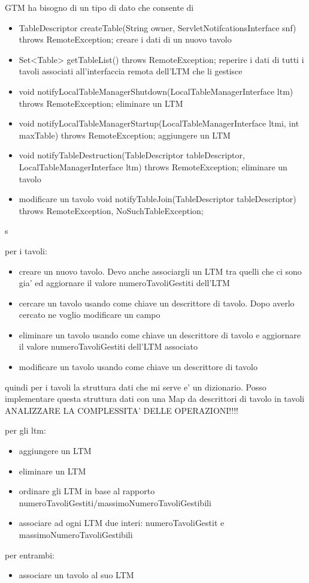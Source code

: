 




GTM ha bisogno di un tipo di dato che consente di
    \begin{itemize}    
      \item 
	TableDescriptor createTable(String owner, ServletNotifcationsInterface snf) throws RemoteException;
	creare i dati di un nuovo tavolo
      \item
	Set<Table> getTableList() throws RemoteException;
	reperire i dati di tutti i tavoli associati all'interfaccia remota dell'LTM che li gestisce
      \item
	void notifyLocalTableManagerShutdown(LocalTableManagerInterface ltm) throws RemoteException;
	eliminare un LTM
      \item
	void notifyLocalTableManagerStartup(LocalTableManagerInterface ltmi, int maxTable) throws RemoteException;
	aggiungere un LTM
      \item
	void notifyTableDestruction(TableDescriptor tableDescriptor, LocalTableManagerInterface ltm) throws RemoteException;
	eliminare un tavolo
      \item
	modificare un tavolo
	void notifyTableJoin(TableDescriptor tableDescriptor) throws RemoteException, NoSuchTableException;
    \end{itemize} 
s

per i tavoli:
\begin{itemize}
    \item 
      creare un nuovo tavolo. Devo anche associargli un LTM tra quelli che ci sono gia' ed aggiornare il valore numeroTavoliGestiti dell'LTM
    \item
      cercare un tavolo usando come chiave un descrittore di tavolo. Dopo averlo cercato ne voglio modificare un campo
    \item
      eliminare un tavolo usando come chiave un descrittore di tavolo e aggiornare il valore numeroTavoliGestiti dell'LTM associato
    \item
      modificare un tavolo usando come chiave un descrittore di tavolo
\end{itemize}
quindi per i tavoli la struttura dati che mi serve e' un dizionario. Posso implementare questa struttura dati con una Map da descrittori di tavolo in tavoli
ANALIZZARE LA COMPLESSITA' DELLE OPERAZIONI!!!!

per gli ltm:
\begin{itemize}
  \item 
    aggiungere un LTM
  \item
    eliminare un LTM
  \item
    ordinare gli LTM in base al rapporto numeroTavoliGestiti/massimoNumeroTavoliGestibili
  \item
    associare ad ogni LTM due interi: numeroTavoliGestit e massimoNumeroTavoliGestibili
\end{itemize}


per entrambi:
\begin{itemize}
  \item 
    associare un tavolo al suo LTM
\end{itemize}


